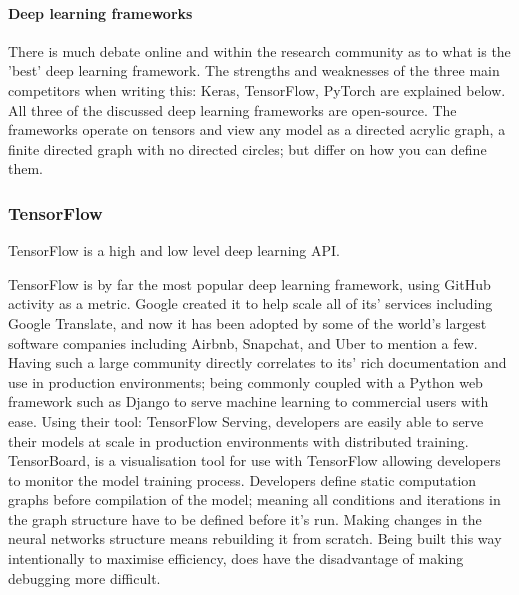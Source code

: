 \documentclass[11pt]{article}
\begin{document}
\paragraph{Deep learning frameworks}

There is much debate online and within the research community as to what is the 'best' deep learning framework. The strengths and weaknesses of the three main competitors when writing this: Keras, TensorFlow, PyTorch are explained below. All three of the discussed deep learning frameworks are open-source. The frameworks operate on tensors and view any model as a directed acrylic graph, a finite directed graph with no directed circles; but differ on how you can define them.  
\subsubsection{TensorFlow}
TensorFlow is a high and low level deep learning API.

TensorFlow is by far the most popular deep learning framework, using GitHub activity as a metric. Google created it to help scale all of its' services including Google Translate, and now it has been adopted by some of the world's largest software companies including Airbnb, Snapchat, and Uber to mention a few. Having such a large community directly correlates to its' rich documentation and use in production environments; being commonly coupled with a Python web framework such as Django to serve machine learning to commercial users with ease. Using their tool: TensorFlow Serving, developers are easily able to serve their models at scale in production environments with distributed training. 
TensorBoard, is a visualisation tool for use with TensorFlow allowing developers to monitor the model training process. 
\newline
Developers define static computation graphs before compilation of the model; meaning all conditions and iterations in the graph structure have to be defined before it's run. Making changes in the neural networks structure means rebuilding it from scratch. Being built this way intentionally to maximise efficiency, does have the disadvantage of making debugging more difficult.

 
\end{document}
